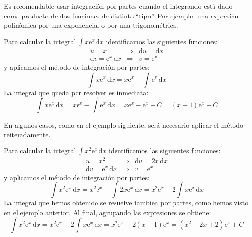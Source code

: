 Es recomendable usar integración por partes cuando el integrando está dado como producto de dos funciones de distinto ``tipo''.
Por ejemplo, una expresión polinómica por una exponencial o por una trigonométrica.
%
\begin{ejemplo}
Para calcular la integral $\displaystyle\int x\text{e}^x\,\mathrm dx$ identificamos las siguientes funciones:
\begin{eqnarray*}
u=x					& \Longrightarrow & \mathrm du=\mathrm dx \\
\mathrm dv=\text{e}^x\,\mathrm dx  & \Longrightarrow & v=\text{e}^x
\end{eqnarray*}
%
y aplicamos el método de integración por partes:
\[
\displaystyle\int x\text{e}^x\,\mathrm dx = x\text{e}^x -\displaystyle\int \text{e}^x\,\mathrm dx
\] 
La integral que queda por resolver es inmediata:
\begin{equation}
\displaystyle\int x\text{e}^x\,\mathrm dx = x\text{e}^x -\displaystyle\int \text{e}^x\,\mathrm dx=
x\text{e}^x - \text{e}^x + C = (x-1)\text{e}^x + C
\tag*{\fej}
\end{equation}
\end{ejemplo}
%
En algunos casos, como en el ejemplo siguiente, será necesario aplicar el método reiteradamente. 
%
\begin{ejemplo}
Para calcular la integral $\displaystyle\int x^2\text{e}^x\,\mathrm dx$ identificamos las siguientes funciones:
\begin{eqnarray*}
u=x^2				& \Longrightarrow & \mathrm du=2x\,\mathrm dx			\\
\mathrm dv=\text{e}^x\,\mathrm dx	& \Longrightarrow & v=\text{e}^x
\end{eqnarray*}
%
y aplicamos el método de integración por partes:
$$
\displaystyle\int x^2\text{e}^x\,\mathrm dx = x^2\text{e}^x -\displaystyle\int 2x\text{e}^x\,\mathrm dx = x^2\text{e}^x - 2 \displaystyle\int x\text{e}^x\,\mathrm dx
$$ 
La integral que hemos obtenido se resuelve también por partes, como hemos visto en el ejemplo anterior.
Al final, agrupando las expresiones se obtiene:
%
\begin{equation}
\displaystyle\int x^2\text{e}^x\,\mathrm dx =
x^2\text{e}^x - 2 \displaystyle\int x\text{e}^x\,\mathrm dx =
x^2\text{e}^x - 2(x-1)\text{e}^x =
(x^2-2x+2)\text{e}^x + C\tag*{\fej}
\end{equation}
\end{ejemplo}

